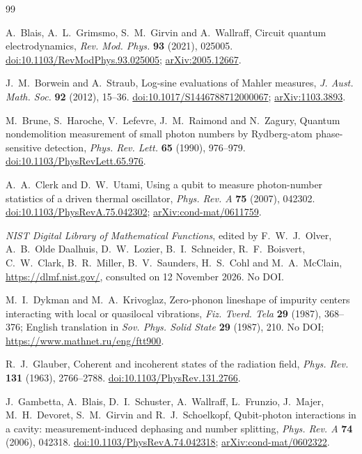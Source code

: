 \documentclass[11pt,reqno]{amsart}
\numberwithin{equation}{section}
\theoremstyle{plain}
\theoremstyle{definition}
\theoremstyle{remark}
\begin{document}
\begin{thebibliography}{99}

A.~Blais, A.~L.~Grimsmo, S.~M.~Girvin and A.~Wallraff, Circuit quantum electrodynamics, \emph{Rev. Mod. Phys.} \textbf{93} (2021), 025005.
\href{https://doi.org/10.1103/RevModPhys.93.025005}{doi:10.1103/RevModPhys.93.025005};
\href{https://arxiv.org/abs/2005.12667}{arXiv:2005.12667}.

J.~M.~Borwein and A.~Straub, Log-sine evaluations of Mahler measures, \emph{J. Aust. Math. Soc.} \textbf{92} (2012), 15--36.
\href{https://doi.org/10.1017/S1446788712000067}{doi:10.1017/S1446788712000067};
\href{https://arxiv.org/abs/1103.3893}{arXiv:1103.3893}.

M.~Brune, S.~Haroche, V.~Lefevre, J.~M.~Raimond and N.~Zagury, Quantum nondemolition measurement of small photon numbers by Rydberg-atom phase-sensitive detection, \emph{Phys. Rev. Lett.} \textbf{65} (1990), 976--979.
\href{https://doi.org/10.1103/PhysRevLett.65.976}{doi:10.1103/PhysRevLett.65.976}.

A.~A.~Clerk and D.~W.~Utami, Using a qubit to measure photon-number statistics of a driven thermal oscillator, \emph{Phys. Rev. A} \textbf{75} (2007), 042302.
\href{https://doi.org/10.1103/PhysRevA.75.042302}{doi:10.1103/PhysRevA.75.042302};
\href{https://arxiv.org/abs/cond-mat/0611759}{arXiv:cond-mat/0611759}.

\emph{NIST Digital Library of Mathematical Functions}, edited by F.~W.~J.~Olver, A.~B.~Olde Daalhuis, D.~W.~Lozier, B.~I.~Schneider, R.~F.~Boisvert, C.~W.~Clark, B.~R.~Miller, B.~V.~Saunders, H.~S.~Cohl and M.~A.~McClain,
\href{https://dlmf.nist.gov/}{https://dlmf.nist.gov/}, consulted on 12 November 2026. No DOI.

M.~I.~Dykman and M.~A.~Krivoglaz, Zero-phonon lineshape of impurity centers interacting with local or quasilocal vibrations, \emph{Fiz. Tverd. Tela} \textbf{29} (1987), 368--376; English translation in \emph{Sov. Phys. Solid State} \textbf{29} (1987), 210. No DOI;
\href{https://www.mathnet.ru/eng/ftt900}{https://www.mathnet.ru/eng/ftt900}.

R.~J.~Glauber, Coherent and incoherent states of the radiation field, \emph{Phys. Rev.} \textbf{131} (1963), 2766--2788.
\href{https://doi.org/10.1103/PhysRev.131.2766}{doi:10.1103/PhysRev.131.2766}.

J.~Gambetta, A.~Blais, D.~I.~Schuster, A.~Wallraff, L.~Frunzio, J.~Majer, M.~H.~Devoret, S.~M.~Girvin and R.~J.~Schoelkopf, Qubit-photon interactions in a cavity: measurement-induced dephasing and number splitting, \emph{Phys. Rev. A} \textbf{74} (2006), 042318.
\href{https://doi.org/10.1103/PhysRevA.74.042318}{doi:10.1103/PhysRevA.74.042318};
\href{https://arxiv.org/abs/cond-mat/0602322}{arXiv:cond-mat/0602322}.


\end{thebibliography}
\end{document}
